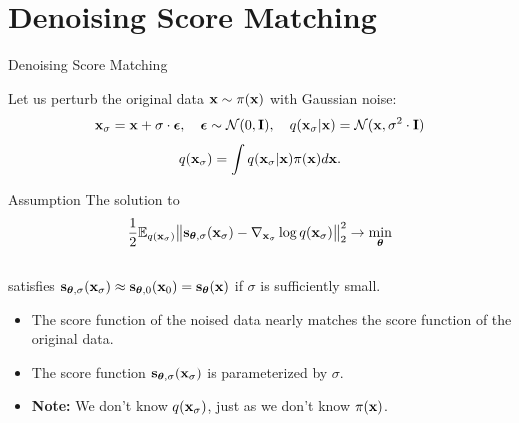 \documentclass{beamer}
\begin{document}
\section{Denoising Score Matching}
\begin{frame}{Denoising Score Matching}

	Let us perturb the original data $\mathbf{x} \sim \pi(\mathbf{x})$ with Gaussian noise:
	\vspace{-0.3cm}
	\[
		\mathbf{x}_{\sigma} = \mathbf{x} + \sigma \cdot \boldsymbol{\epsilon}, \quad \boldsymbol{\epsilon} \sim \mathcal{N}(0, \mathbf{I}), \quad q(\mathbf{x}_{\sigma} | \mathbf{x}) = \mathcal{N}(\mathbf{x}, \sigma^2 \cdot \mathbf{I})
	\]
	\eqpause
	\vspace{-0.4cm}
	\[
		q(\mathbf{x}_{\sigma}) = \int q(\mathbf{x}_{\sigma} | \mathbf{x}) \pi(\mathbf{x}) d\mathbf{x}.
	\]
	\eqpause
	\vspace{-0.5cm}
	\begin{block}{Assumption}
		The solution to
		\[
			\frac{1}{2} \mathbb{E}_{q(\mathbf{x}_{\sigma})}\big\| \mathbf{s}_{\boldsymbol{\theta}, \sigma}(\mathbf{x}_{\sigma}) - \nabla_{\mathbf{x}_{\sigma}} \log q(\mathbf{x}_{\sigma}) \big\|^2_2 \rightarrow \min_{\boldsymbol{\theta}}
		\]
		\vspace{-0.3cm} \\
		satisfies $\mathbf{s}_{\boldsymbol{\theta}, \sigma}(\mathbf{x}_{\sigma}) \approx \mathbf{s}_{\boldsymbol{\theta}, 0}(\mathbf{x}_0) = \mathbf{s}_{\boldsymbol{\theta}}(\mathbf{x})$ if $\sigma$ is sufficiently small.
	\end{block}
	\eqpause
	\begin{itemize}
		\item The score function of the noised data nearly matches the score function of the original data.
		\item The score function $\mathbf{s}_{\boldsymbol{\theta}, \sigma}(\mathbf{x}_{\sigma})$ is parameterized by $\sigma$.
		\item \textbf{Note:} We don't know $q(\mathbf{x}_{\sigma})$, just as we don't know $\pi(\mathbf{x})$.
	\end{itemize}
\end{frame}
\end{document}
